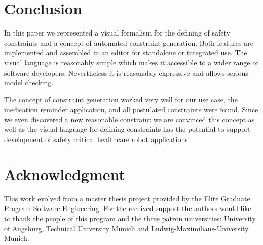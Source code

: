 \documentclass[conference]{IEEEtran}
\begin{document}
\section{Conclusion}

In this paper we represented a visual formalism for the defining of safety constraints and a concept of automated constraint generation. Both features are implemented and assembled in an editor for standalone or integrated use. The visual language is reasonably simple which makes it accessible to a wider range of software developers. Nevertheless it is reasonably expressive and allows serious model checking.

The concept of constraint generation worked very well for our use case, the medication reminder application, and all postulated constraints were found. Since we even discovered a new reasonable constraint we are convinced this concept as well as the visual language for defining constraints has the potential to support development of safety critical healthcare robot applications.






\section*{Acknowledgment}

This work evolved from a master thesis project provided by the Elite Graduate Program Software Engineering. 
For the received support the authors would like to thank the people of this program and the three patron universities: University of Augsburg, Technical University Munich and Ludwig-Maximilians-University Munich.
 









%
\end{document}
